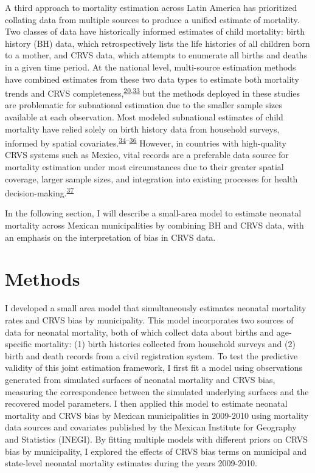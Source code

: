 \documentclass[
]{article}
\begin{document}
A third approach to mortality estimation across Latin America has prioritized collating data from multiple sources to produce a unified estimate of mortality. Two classes of data have historically informed estimates of child mortality: birth history (BH) data, which retrospectively lists the life histories of all children born to a mother, and CRVS data, which attempts to enumerate all births and deaths in a given time period. At the national level, multi-source estimation methods have combined estimates from these two data types to estimate both mortality trends and CRVS completeness,\textsuperscript{\protect\hyperlink{ref-Dicker2018}{20},\protect\hyperlink{ref-Fisker2019}{33}} but the methods deployed in these studies are problematic for subnational estimation due to the smaller sample sizes available at each observation. Most modeled subnational estimates of child mortality have relied solely on birth history data from household surveys, informed by spatial covariates.\textsuperscript{\protect\hyperlink{ref-Golding2017}{34}--\protect\hyperlink{ref-Wakefield2019}{36}} However, in countries with high-quality CRVS systems such as Mexico, vital records are a preferable data source for mortality estimation under most circumstances due to their greater spatial coverage, larger sample sizes, and integration into existing processes for health decision-making.\textsuperscript{\protect\hyperlink{ref-UnitedNationsStatisticsDivision2014}{37}}

In the following section, I will describe a small-area model to estimate neonatal mortality across Mexican municipalities by combining BH and CRVS data, with an emphasis on the interpretation of bias in CRVS data.

\hypertarget{methods}{%
\section{Methods}\label{methods}}

I developed a small area model that simultaneously estimates neonatal mortality rates and CRVS bias by municipality. This model incorporates two sources of data for neonatal mortality, both of which collect data about births and age-specific mortality: (1) birth histories collected from household surveys and (2) birth and death records from a civil registration system. To test the predictive validity of this joint estimation framework, I first fit a model using observations generated from simulated surfaces of neonatal mortality and CRVS bias, measuring the correspondence between the simulated underlying surfaces and the recovered model parameters. I then applied this model to estimate neonatal mortality and CRVS bias by Mexican municipalities in 2009-2010 using mortality data sources and covariates published by the Mexican Institute for Geography and Statistics (INEGI). By fitting multiple models with different priors on CRVS bias by municipality, I explored the effects of CRVS bias terms on municipal and state-level neonatal mortality estimates during the years 2009-2010.
\end{document}
